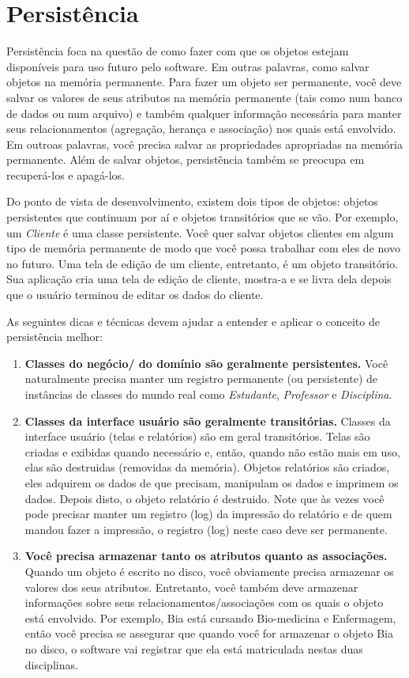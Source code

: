 \documentclass[
	article,			%
	12pt,				%
	openright,
	twoside,			%
	a4paper,			%
	english,			%
	french,
	brazil,				%
	sumario=tradicional
	]{abntex2}
\begin{document}
\section{Persistência}

Persistência foca na questão de como fazer com que os objetos estejam disponíveis para uso futuro pelo software. Em outras palavras, como salvar objetos na memória permanente. Para fazer um objeto ser permanente, você deve salvar os valores de seus atributos na memória permanente (tais como num banco de dados ou num arquivo) e também qualquer informação necessária para manter seus relacionamentos (agregação, herança e associação) nos quais está envolvido. Em outroas palavras, você precisa salvar as propriedades apropriadas na memória permanente. Além de salvar objetos, persistência também se preocupa em recuperá-los e apagá-los.

Do ponto de vista de desenvolvimento, existem dois tipos de objetos: objetos persistentes que continuam por aí e objetos transitórios que se vão. Por exemplo, um \emph{Cliente} é uma classe persistente. Você quer salvar objetos clientes em algum tipo de memória permanente de modo que você possa trabalhar com eles de novo no futuro. Uma tela de edição de um cliente, entretanto, é um objeto transitório. Sua aplicação cria uma tela de edição de cliente, mostra-a e se livra dela depois que o usuário terminou de editar os dados do cliente.

As seguintes dicas e técnicas devem ajudar a entender e aplicar o conceito de persistência melhor:

\begin{enumerate}
\item \textbf{Classes do negócio/ do domínio são geralmente persistentes.} Você  naturalmente precisa manter um registro permanente (ou persistente) de instâncias de classes do mundo real como \emph{Estudante}, \emph{Professor} e \emph{Disciplina}.

\item \textbf{Classes da interface usuário são geralmente transitórias.} Classes da interface usuário (telas e relatórios) são em geral transitórios. Telas são criadas e exibidas quando necessário e, então, quando não estão mais em uso, elas são destruidas (removidas da memória). Objetos relatórios são criados, eles adquirem os dados de que precisam, manipulam os dados e imprimem os dados. Depois disto, o objeto relatório é destruido. Note que às vezes você pode precisar manter um registro (log) da impressão do relatório e de quem mandou fazer a impressão, o registro (log) neste caso deve ser permanente.

\item \textbf{Você precisa armazenar tanto os atributos quanto as associações.}
Quando um objeto é escrito no disco, você obviamente precisa armazenar os valores dos seus atributos. Entretanto, você também deve armazenar informações sobre seus relacionamentos/associações com os quais o objeto está envolvido. Por exemplo, Bia está cursando Bio-medicina e Enfermagem, então você precisa se assegurar que quando você for armazenar o objeto Bia no disco, o software vai registrar que ela está matriculada nestas duas disciplinas.
\end{enumerate}
\end{document}

